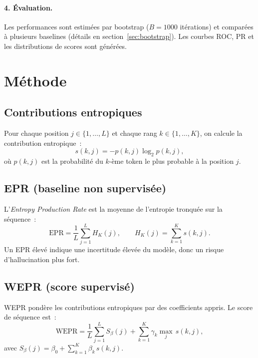 \documentclass[11pt,a4paper]{article}
\begin{document}
\paragraph{4. Évaluation.}
Les performances sont estimées par bootstrap ($B = 1000$ itérations) et comparées à plusieurs baselines (détails en section~\ref{sec:bootstrap}). Les courbes ROC, PR et les distributions de scores sont générées.

\section{Méthode}\label{sec:methode}

\subsection{Contributions entropiques}

Pour chaque position $j \in \{1, \dots, L\}$ et chaque rang $k \in \{1, \dots, K\}$, on calcule la contribution entropique~:
\begin{equation}
    s(k, j) = -p(k, j) \log_2 p(k, j),
\end{equation}
où $p(k,j)$ est la probabilité du $k$-ème token le plus probable à la position $j$.

\subsection{EPR (baseline non supervisée)}

L'\emph{Entropy Production Rate} est la moyenne de l'entropie tronquée sur la séquence~:
\begin{equation}
    \text{EPR} = \frac{1}{L} \sum_{j=1}^{L} H_K(j), \qquad H_K(j) = \sum_{k=1}^{K} s(k,j).
\end{equation}
Un EPR élevé indique une incertitude élevée du modèle, donc un risque d'hallucination plus fort.

\subsection{WEPR (score supervisé)}

WEPR pondère les contributions entropiques par des coefficients appris. Le score de séquence est~:
\begin{equation}
    \text{WEPR} = \frac{1}{L} \sum_{j=1}^{L} S_\beta(j) + \sum_{k=1}^{K} \gamma_k \max_j\, s(k,j),
\end{equation}
avec $S_\beta(j) = \beta_0 + \sum_{k=1}^{K} \beta_k\, s(k,j)$.
\end{document}
